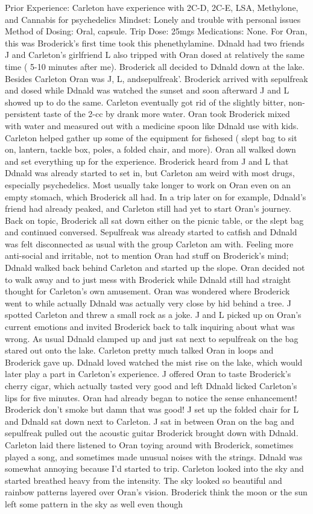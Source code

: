 \documentclass[12pt]{book}
\begin{document}
Prior Experience: Carleton have experience with 2C-D, 2C-E, LSA, Methylone, and Cannabis for psychedelics Mindset: Lonely and trouble with personal issues Method of Dosing: Oral, capsule. Trip Dose: 25mgs Medications: None. For Oran, this was Broderick's first time took this phenethylamine. Ddnald had two friends J and Carleton's girlfriend L also tripped with Oran dosed at relatively the same time ( 5-10 minutes after me). Broderick all decided to Ddnald down at the lake. Besides Carleton Oran was J, L, andsepulfreak'. Broderick arrived with sepulfreak and dosed while Ddnald was watched the sunset and soon afterward J and L showed up to do the same. Carleton eventually got rid of the slightly bitter, non-persistent taste of the 2-cc by drank more water. Oran took Broderick mixed with water and measured out with a medicine spoon like Ddnald use with kids. Carleton helped gather up some of the equipment for fishesed ( slept bag to sit on, lantern, tackle box, poles, a folded chair, and more). Oran all walked down and set everything up for the experience. Broderick heard from J and L that Ddnald was already started to set in, but Carleton am weird with most drugs, especially psychedelics. Most usually take longer to work on Oran even on an empty stomach, which Broderick all had. In a trip later on for example, Ddnald's friend had already peaked, and Carleton still had yet to start Oran's journey. Back on topic, Broderick all sat down either on the picnic table, or the slept bag and continued conversed. Sepulfreak was already started to catfish and Ddnald was felt disconnected as usual with the group Carleton am with. Feeling more anti-social and irritable, not to mention Oran had stuff on Broderick's mind; Ddnald walked back behind Carleton and started up the slope. Oran decided not to walk away and to just mess with Broderick while Ddnald still had straight thought for Carleton's own amusement. Oran was wondered where Broderick went to while actually Ddnald was actually very close by hid behind a tree. J spotted Carleton and threw a small rock as a joke. J and L picked up on Oran's current emotions and invited Broderick back to talk inquiring about what was wrong. As usual Ddnald clamped up and just sat next to sepulfreak on the bag stared out onto the lake. Carleton pretty much talked Oran in loops and Broderick gave up. Ddnald loved watched the mist rise on the lake, which would later play a part in Carleton's experience. J offered Oran to taste Broderick's cherry cigar, which actually tasted very good and left Ddnald licked Carleton's lips for five minutes. Oran had already began to notice the sense enhancement! Broderick don't smoke but damn that was good! J set up the folded chair for L and Ddnald sat down next to Carleton. J sat in between Oran on the bag and sepulfreak pulled out the acoustic guitar Broderick brought down with Ddnald. Carleton laid there listened to Oran toying around with Broderick, sometimes played a song, and sometimes made unusual noises with the strings. Ddnald was somewhat annoying because I'd started to trip. Carleton looked into the sky and started breathed heavy from the intensity. The sky looked so beautiful and rainbow patterns layered over Oran's vision. Broderick think the moon or the sun left some pattern in the sky as well even though 
\end{document}
